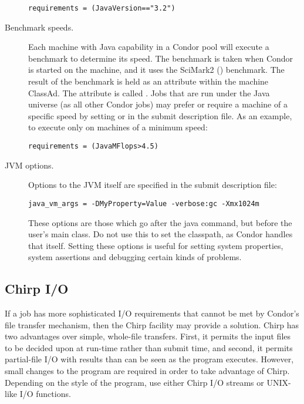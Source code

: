 \begin{description}
\begin{verbatim}
requirements = (JavaVersion=="3.2")
\end{verbatim}

\item[Benchmark speeds.]
Each machine with Java capability in a Condor pool
will execute a benchmark to determine its speed.
The benchmark is taken when Condor is started on
the machine, and it uses the SciMark2
() benchmark.
The result of the benchmark is held as an attribute
within the 
machine ClassAd.
The attribute is called .
Jobs that are run under the Java universe (as all other Condor jobs)
may prefer or require a machine of a specific speed
by setting  or  in
the submit description file.
As an example, to execute only on machines of a minimum speed:

\begin{verbatim}
requirements = (JavaMFlops>4.5)
\end{verbatim}

\item[JVM options.]
Options to the JVM itself are specified in the 
submit description file:

\begin{verbatim}
java_vm_args = -DMyProperty=Value -verbose:gc -Xmx1024m
\end{verbatim}

These options are those which go after the java command, but before
the user's main class.  Do not use this to set the classpath, as
Condor handles that itself.  Setting these options is useful for
setting system properties, system assertions and debugging certain
kinds of problems.

\end{description}

\subsection{Chirp I/O}

If a job has more sophisticated I/O requirements that cannot
be met by Condor's file transfer mechanism,
then the Chirp facility may provide a solution.
Chirp has two advantages over simple, whole-file transfers.
First, it permits the input files to be decided upon at run-time
rather than submit time, and second,
it permits partial-file I/O with results than can be seen as the
program executes.
However, small changes to the program are required
in order to take advantage of Chirp.
Depending on the style of the program, use either Chirp I/O streams
or UNIX-like I/O functions.

